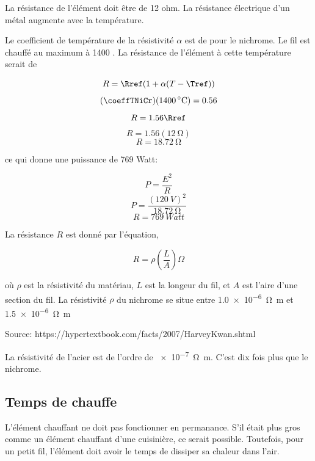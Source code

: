 \documentclass{article}
\begin{document}
La résistance de l'élément doit être de 12 ohm. La résistance électrique d'un métal augmente avec la température.

\var{}

Le coefficient de température de la résistivité $\alpha$ est de \coeffTNiCr pour le nichrome. Le fil est chauffé au maximum à 1400 \celsius.
La résistance de l'élément à cette température serait de

\var{}
\var{}
\begin{equation}
    R = \Rref(1 + \alpha(T - \Tref))
\end{equation}
\[(\coeffTNiCr)(\SI{1400}{\celsius}) = 0.56\]
\[R = 1.56 \Rref\]
\[R = 1.56(\SI{12}{\ohm})\]
\[\boxed{R = \SI{18.72}{\ohm}}\]

ce qui donne une puissance de 769 Watt:

\[P = \frac{E^2}{R}\]
\[P = \frac{(\SI{120}{V})^2}{\SI{18.72}{\ohm}}\]
\[\boxed{R = \SI{769}{Watt}}\]

La résistance $R$ est donné par l'équation,

\begin{equation}
    R = \rho(\frac{L}{A})\Omega
\end{equation}

où $\rho$ est la résistivité du matériau, $L$ est la longeur du fil, et $A$ est l'aire d'une section du fil. La résistivité $\rho$ du nichrome se situe entre \SI{1,0e-6}{\ohm\metre} et \SI{1,5e-6}{\ohm\metre}

Source: https://hypertextbook.com/facts/2007/HarveyKwan.shtml


La résistivité de l'acier est de l'ordre de \SI{e-7}{\ohm\metre}. C'est dix fois plus que le nichrome.

\subsection{Temps de chauffe}

L'élément chauffant ne doit pas fonctionner en permanance. S'il était plus gros comme un élément chauffant d'une cuisinière, ce serait possible. Toutefois, pour un petit fil, l'élément doit avoir le temps de dissiper sa chaleur dans l'air.

\end{document}
